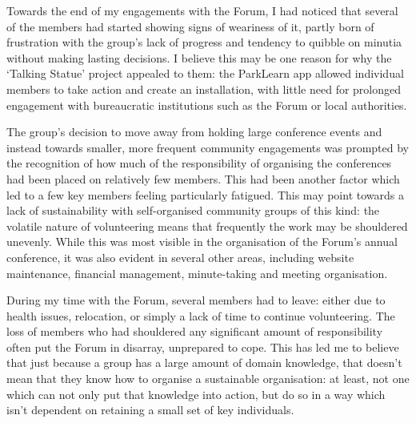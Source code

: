Towards the end of my engagements with the Forum, I had noticed that several of the members had started showing signs of weariness of it, partly born of frustration with the group's lack of progress and tendency to quibble on minutia without making lasting decisions. I believe this may be one reason for why the `Talking Statue' project appealed to them: the ParkLearn app allowed individual members to take action and create an installation, with little need for prolonged engagement with bureaucratic institutions such as the Forum or local authorities.

The group's decision to move away from holding large conference events and instead towards smaller, more frequent community engagements was prompted by the recognition of how much of the responsibility of organising the conferences had been placed on relatively few members. This had been another factor which led to a few key members feeling particularly fatigued. This may point towards a lack of sustainability with self-organised community groups of this kind: the volatile nature of volunteering means that frequently the work may be shouldered unevenly. While this was most visible in the organisation of the Forum's annual conference, it was also evident in several other areas, including website maintenance, financial management, minute-taking and meeting organisation. 

During my time with the Forum, several members had to leave: either due to health issues, relocation, or simply a lack of time to continue volunteering. The loss of members who had shouldered any significant amount of responsibility often put the Forum in disarray, unprepared to cope. This has led me to believe that just because a group has a large amount of domain knowledge, that doesn't mean that they know how to organise a sustainable organisation: at least, not one which can not only put that knowledge into action, but do so in a way which isn't dependent on retaining a small set of key individuals.

